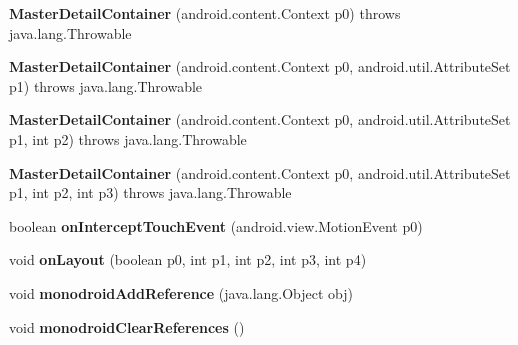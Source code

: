 \begin{DoxyCompactItemize}
\item 
\mbox{\label{classmd5b60ffeb829f638581ab2bb9b1a7f4f3f_1_1_master_detail_container_a1af6b6d44bea0fd2817369e2e442b274}} 
{\bfseries Master\+Detail\+Container} (android.\+content.\+Context p0)  throws java.\+lang.\+Throwable 	
\item 
\mbox{\label{classmd5b60ffeb829f638581ab2bb9b1a7f4f3f_1_1_master_detail_container_ac9b0445081c2aabb67adc98d6b8c9ca1}} 
{\bfseries Master\+Detail\+Container} (android.\+content.\+Context p0, android.\+util.\+Attribute\+Set p1)  throws java.\+lang.\+Throwable 	
\item 
\mbox{\label{classmd5b60ffeb829f638581ab2bb9b1a7f4f3f_1_1_master_detail_container_a3e752c4a1c463a622ff8574921b3c763}} 
{\bfseries Master\+Detail\+Container} (android.\+content.\+Context p0, android.\+util.\+Attribute\+Set p1, int p2)  throws java.\+lang.\+Throwable 	
\item 
\mbox{\label{classmd5b60ffeb829f638581ab2bb9b1a7f4f3f_1_1_master_detail_container_a02e06b2d64b99adfc10ba2adc27242c9}} 
{\bfseries Master\+Detail\+Container} (android.\+content.\+Context p0, android.\+util.\+Attribute\+Set p1, int p2, int p3)  throws java.\+lang.\+Throwable 	
\item 
\mbox{\label{classmd5b60ffeb829f638581ab2bb9b1a7f4f3f_1_1_master_detail_container_ae96ebc11fc79fa8ff77d7106dac3971a}} 
boolean {\bfseries on\+Intercept\+Touch\+Event} (android.\+view.\+Motion\+Event p0)
\item 
\mbox{\label{classmd5b60ffeb829f638581ab2bb9b1a7f4f3f_1_1_master_detail_container_a0ef2e1e3ab4836b6a210d6af09d780c6}} 
void {\bfseries on\+Layout} (boolean p0, int p1, int p2, int p3, int p4)
\item 
\mbox{\label{classmd5b60ffeb829f638581ab2bb9b1a7f4f3f_1_1_master_detail_container_a5f8aaba34799a0323fa0d77618dfae96}} 
void {\bfseries monodroid\+Add\+Reference} (java.\+lang.\+Object obj)
\item 
\mbox{\label{classmd5b60ffeb829f638581ab2bb9b1a7f4f3f_1_1_master_detail_container_a4bbf2f5847044e80a0b1b8e54eb8f621}} 
void {\bfseries monodroid\+Clear\+References} ()
\end{DoxyCompactItemize}
